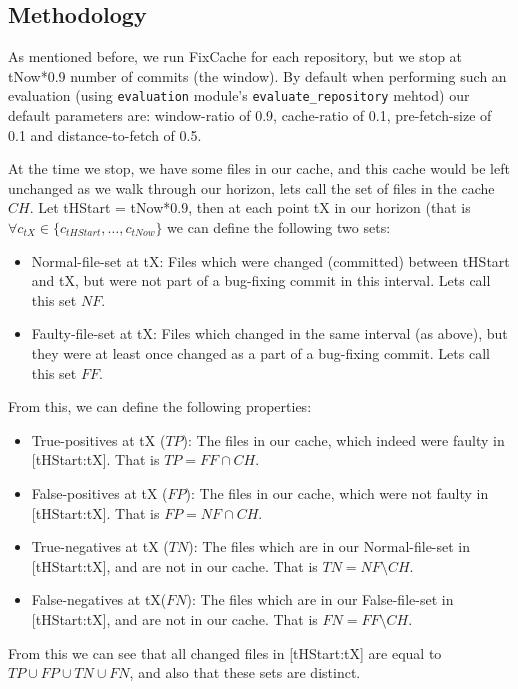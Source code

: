 \documentclass[12pt,twoside,notitlepage]{report}
\newcommand{\fxch}{FixCache}
\begin{document}
\subsection{Methodology}
As mentioned before, we run \fxch{} for each repository, but we stop at tNow*0.9 number of commits (the window). By default when performing such an evaluation (using \texttt{evaluation} module's \texttt{evaluate\_repository} mehtod) our default parameters are: window-ratio of 0.9, cache-ratio of 0.1, pre-fetch-size of 0.1 and distance-to-fetch of 0.5.

At the time we stop, we have some files in our cache, and this cache would be left unchanged as we walk through our horizon, lets call the set of files in the cache $CH$. Let tHStart = tNow*0.9, then at each point tX in our horizon (that is $\forall c_{tX} \in \{c_{tHStart}, \dots, c_{tNow}\}$ we can define the following two sets:
\begin{itemize}
\item Normal-file-set at tX: Files which were changed (committed) between tHStart and tX, but were not part of a bug-fixing commit in this interval. Lets call this set $NF$.
\item Faulty-file-set at tX: Files which changed in the same interval (as above), but they were at least once changed as a part of a bug-fixing commit. Lets call this set $FF$.
\end{itemize}

From this, we can define the following properties:
\begin{itemize}
\item True-positives at tX ($TP$): The files in our cache, which indeed were faulty in [tHStart:tX]. That is $TP = FF \cap CH$.
\item False-positives at tX ($FP$): The files in our cache, which were not faulty in [tHStart:tX]. That is $FP = NF \cap CH$.
\item True-negatives at tX ($TN$): The files which are in our Normal-file-set in [tHStart:tX], and are not in our cache. That is $TN = NF \setminus CH$.
\item False-negatives at tX($FN$): The files which are in our False-file-set in [tHStart:tX], and are not in our cache. That is $FN = FF \setminus CH$.
\end{itemize}
From this we can see that all changed files in [tHStart:tX] are equal to $TP \cup FP \cup TN \cup FN$, and also that these sets are distinct.
\end{document}
